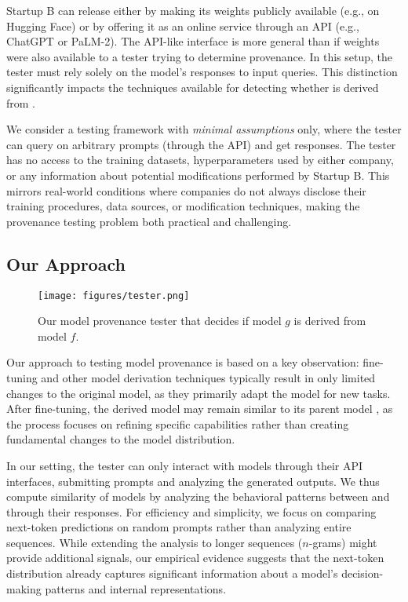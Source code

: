 Startup B can release \llmf either by making its weights publicly available (e.g., on Hugging Face) or by offering it as an online service through an API (e.g., ChatGPT or PaLM-2).
The API-like interface is more general than if weights were also available to a tester trying to determine provenance.
In this setup, the tester must rely solely on the model's responses to input queries. This distinction significantly impacts the techniques available for detecting whether \llmf is derived from \llmp.

We consider a testing framework with \emph{minimal assumptions} only, where the tester can query \llmf on arbitrary prompts (through the API) and get responses. 
The tester has no access to the training datasets, hyperparameters used by either company, or any information about potential modifications performed by Startup B. 
%
This mirrors real-world conditions where companies do not always disclose their training procedures, data sources, or modification techniques, making the provenance testing problem both practical and challenging.


\subsection{Our Approach}
\label{sec:overview-approach}

\begin{figure}[!t]  
    \centering
    \texttt{[image: figures/tester.png]}
    \caption{Our model provenance tester that decides if model $g$ is derived from model $f$.
    }
    \label{fig:tester}
\end{figure}


Our approach to testing model provenance is based on a key observation: fine-tuning and other model derivation techniques typically result in only limited changes to the original model, as they primarily adapt the model for new tasks. After fine-tuning, the derived model \llmf  may remain similar to its parent model  \llmp, as the process focuses on refining specific capabilities rather than creating fundamental changes to the model distribution.

In our setting, the tester can only interact with models through their API interfaces, submitting prompts and analyzing the generated outputs. We thus compute similarity of models by analyzing the behavioral patterns between \llmp and \llmf through their responses.
%
For efficiency and simplicity, we focus on comparing next-token predictions on random prompts rather than analyzing entire sequences. While extending the analysis to longer sequences ($n$-grams) might provide additional signals, 
our empirical evidence suggests that
the next-token distribution already captures significant information about a model's decision-making patterns and internal representations.

